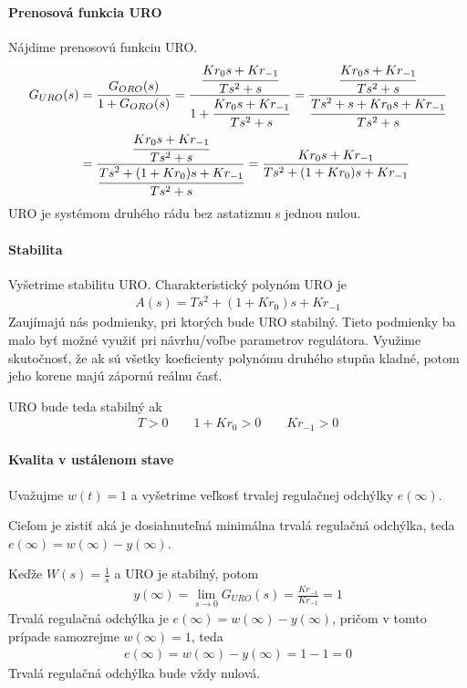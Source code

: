 \documentclass[a4paper, 10pt, ]{article}
\begin{document}
\paragraph{Prenosová funkcia URO}
Nájdime prenosovú funkciu URO.
\begin{align}
    \begin{aligned}
    G_{URO}(s)
    &=  \frac{G_{ORO}(s)}{1+G_{ORO}(s)}
    = \frac{   \cfrac{K r_0 s + Kr_{-1}}{Ts^2+s}   }{   1+  \cfrac{K r_0 s + Kr_{-1}}{Ts^2+s} }
    = \frac{   \cfrac{K r_0 s + Kr_{-1}}{Ts^2+s}   }{   \cfrac{Ts^2+s + K r_0 s + Kr_{-1}}{Ts^2+s} } \\
    &= \frac{   \cfrac{K r_0 s + Kr_{-1}}{Ts^2+s}   }{   \cfrac{Ts^2+  (1 + K r_0) s + Kr_{-1}}{Ts^2+s} }
    = \frac{   K r_0 s + Kr_{-1}   }{   Ts^2+  (1 + K r_0) s + Kr_{-1} }
    \end{aligned}
\end{align}
URO je systémom druhého rádu bez astatizmu s jednou nulou.



\paragraph{Stabilita}

Vyšetrime stabilitu URO. Charakteristický polynóm URO je
\begin{align}
    A(s) = Ts^2+  (1 + K r_0) s + Kr_{-1}
\end{align}
Zaujímajú nás podmienky, pri ktorých bude URO stabilný. Tieto podmienky ba malo byť možné využiť pri návrhu/voľbe parametrov regulátora. Využime skutočnosť, že ak sú všetky koeficienty polynómu druhého stupňa kladné, potom jeho korene majú zápornú reálnu časť.

URO bude teda stabilný ak
\begin{align}
    T>0 \qquad 1+K r_0 >0 \qquad K r_{-1} > 0
\end{align}



\paragraph{Kvalita v ustálenom stave}
Uvažujme $w(t) = 1$ a vyšetrime veľkosť trvalej regulačnej odchýlky $e(\infty)$.

Cieľom je zistiť aká je dosiahnuteľná minimálna trvalá regulačná odchýlka, teda  $e(\infty) = w(\infty) - y(\infty)$.

Keďže $W(s) = \frac{1}{s}$ a URO je stabilný, potom
\begin{align}
    y(\infty) = \lim_{s\to0} G_{URO}(s) = \frac{K r_{-1}}{K r_{-1}} = 1
\end{align}
Trvalá regulačná odchýlka je $e(\infty) = w(\infty) - y(\infty)$, pričom v tomto prípade samozrejme $ w(\infty) = 1$, teda
\begin{align}
    e(\infty)
    = w(\infty) - y(\infty)
    = 1 - 1
    = 0
\end{align}
Trvalá regulačná odchýlka bude vždy nulová.
\end{document}
